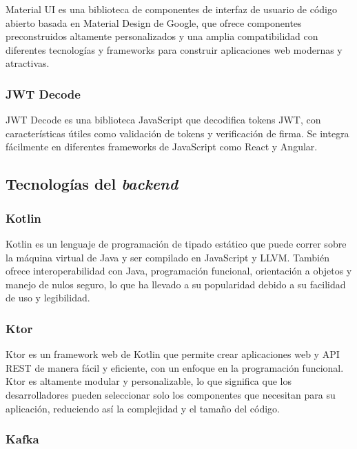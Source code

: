 Material UI \citep{material-ui} es una biblioteca de componentes de interfaz de usuario de código abierto basada en Material Design de Google, que ofrece componentes preconstruidos altamente personalizados y una amplia compatibilidad con diferentes tecnologías y frameworks para construir aplicaciones web modernas y atractivas.


\subsubsection{JWT Decode}

JWT Decode \citep{jwt-decode} es una biblioteca JavaScript que decodifica tokens JWT, con características útiles como validación de tokens y verificación de firma. Se integra fácilmente en diferentes frameworks de JavaScript como React y Angular.


\newpage
\subsection{Tecnologías del \textit{backend}}


\subsubsection{Kotlin}

Kotlin \citep{kotlin} es un lenguaje de programación de tipado estático que puede correr sobre la máquina virtual de Java y ser compilado en JavaScript y LLVM. También ofrece interoperabilidad con Java, programación funcional, orientación a objetos y manejo de nulos seguro, lo que ha llevado a su popularidad debido a su facilidad de uso y legibilidad.


\subsubsection{Ktor}

Ktor \citep{ktor} es un framework web de Kotlin que permite crear aplicaciones web y API REST de manera fácil y eficiente, con un enfoque en la programación funcional. Ktor es altamente modular y personalizable, lo que significa que los desarrolladores pueden seleccionar solo los componentes que necesitan para su aplicación, reduciendo así la complejidad y el tamaño del código. 


\subsubsection{Kafka}

